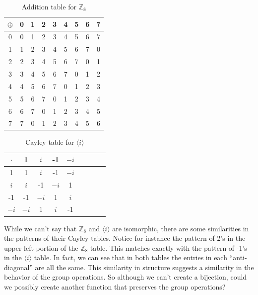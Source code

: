 \begin{table}[H]
\caption{\label{groups_Z8_add_table2}Addition table for ${\mathbb Z}_8$}{\small
\begin{center}
\begin{tabular}{c|cccccccc}
$\oplus$ & 0 & 1 & 2 & 3 & 4 & 5 & 6 & 7 \\
\hline
0        & 0 & 1 & 2 & 3 & 4 & 5 & 6 & 7 \\
1       & 1 & 2 & 3 & 4 & 5 & 6 & 7 & 0 \\
2       & 2 & 3 & 4 & 5 & 6 & 7 & 0 & 1\\
3       & 3 & 4 & 5 & 6 & 7 & 0 & 1 & 2\\
4       & 4 & 5 & 6 & 7 & 0 & 1 & 2 & 3\\
5       & 5 & 6 & 7 & 0 & 1 & 2 & 3 & 4\\
6       & 6 & 7 & 0 & 1 & 2 & 3 & 4 & 5\\
7       & 7 & 0 & 1 & 2 & 3 & 4 & 5 & 6\\
\end{tabular}
\end{center}
}
\end{table}

\begin{table}[H]
\caption{Cayley table for $\langle i \rangle$}
\label{4_roots_table2}
{\small
\begin{center}
\begin{tabular}{c|cccccccc}
$\cdot$ & 1 &$i$ & -1 & $-i$  \\
\hline
1        & 1 &$i$ & -1 &$-i$  \\
$i$       &$i$ & -1 & $-i$ & 1  \\
-1       & -1 & $-i$ & 1 & $i$ \\
$-i$       & $-i$ & 1 & $i$ & -1 \\

\end{tabular}
\end{center}
}
\end{table}  

While we can't say that ${\mathbb Z_8}$ and $\langle i \rangle$ are isomorphic, there  are some similarities in the patterns of their Cayley tables.  
Notice for instance the pattern of 2's in the upper left portion of the ${\mathbb Z_8}$ table. This matches exactly with the pattern of -1's in the $\langle i \rangle$ table. In fact, we can see that in both tables the entries in each ``anti-diagonal'' are all the same. 
This similarity in structure suggests a similarity in the behavior of the group operations.  
So although we can't create a bijection, could we possibly create another function that preserves the group operations?   

